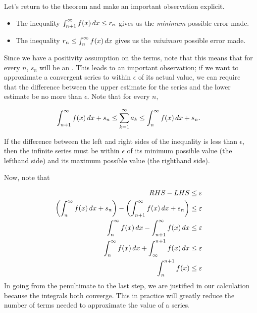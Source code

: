 \documentclass{ximera}
\begin{document}
Let's return to the theorem and make an important observation explicit.

\begin{itemize}
\item The inequality $\int_{n+1}^{\infty} f(x) \mathop{}\!d x \leq  r_n$ gives us the \emph{minimum} possible error made.
\item The inequality $r_n \leq \int_{n}^{\infty} f(x) \mathop{}\!d x$ gives us the \emph{minimum} possible error made.
\end{itemize}

Since we have a positivity assumption on the terms, note that this means that for every $n$, $s_n$ will be an .  This leads to an important observation; if we want to approximate a convergent series to within $\epsilon$ of its actual value, we can require that the difference between the upper estimate for the series and the lower estimate be no more than $\epsilon$.  Note that for every $n$,

\[
\int_{n+1}^\infty f(x) \mathop{}\!d x  +s_n \leq \sum_{k=1}^{\infty} a_k \leq \int_{n}^\infty f(x) \mathop{}\!d x  +s_n.
\]
 
If the difference between the left and right sides of the inequality is less than $\epsilon$, then the infinite series must be within $\epsilon$ of its minimum possible value (the lefthand side) and its maximum possible value (the righthand side).
 
Now, note that

\begin{align*}
RHS-LHS &\leq \varepsilon \\
\left( \int_{n}^\infty f(x) \mathop{}\!d x  +s_n\right) - \left( \int_{n+1}^\infty f(x) \mathop{}\!d x  +s_n \right) &\leq \varepsilon \\
 \int_{n}^\infty f(x) \mathop{}\!d x  - \int_{n+1}^\infty f(x) \mathop{}\!d x   &\leq \varepsilon \\
  \int_{n}^\infty f(x) \mathop{}\!d x  +  \int_{\infty}^{n+1} f(x) \mathop{}\!d x   &\leq \varepsilon \\
    \int_{n}^{n+1} f(x)  &\leq \varepsilon \\
\end{align*} 
In going from the penultimate to the last step, we are justified in our calculation because the integrals both converge.  This in practice will greatly reduce the number of terms needed to approximate the value of a series.
\end{document}
